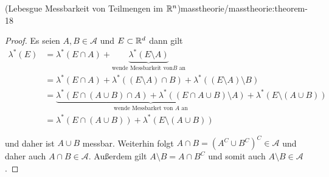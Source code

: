 \begin{theorem}{(Lebesgue Messbarkeit von Teilmengen im \protect\(\mathbb{R}^n\protect\))}{masstheorie/masstheorie:theorem-18}
\begin{proof}
\par
Es seien \(A,B\in\mathcal{A}\) und \(E\subset\mathbb{R}^d\) dann gilt
\begin{align*}
\lambda^\ast(E) &= \lambda^\ast(E\cap A) + \underbrace{\lambda^\ast(E\setminus A)}_{\text{wende Messbarkeit von} B\text{ an}}\\
&=\lambda^\ast(E\cap A) + \lambda^\ast((E\setminus A)\cap B) + \lambda^\ast((E\setminus A)\setminus B)\\
&=
\underbrace{\lambda^\ast(E\cap (A\cup B)\cap A) + \lambda^\ast((E\cap A\cup B)\setminus A)}_{\text{wende Messbarket von } A \text{ an}} + \lambda^\ast(E\setminus(A\cup B))\\
&=
\lambda^\ast(E\cap (A\cup B)) + \lambda^\ast(E\setminus(A\cup B))
\end{align*}
\par
und daher ist \(A\cup B\) messbar. Weiterhin folgt \(A\cap B = (A^C\cup B^C)^C\in\mathcal{A}\) und daher auch \(A\cap B\in\mathcal{A}\). Außerdem gilt \(A\setminus B = A\cap B^C\) und somit auch \(A\setminus B\in\mathcal{A}\).


\end{proof}
\end{theorem}
